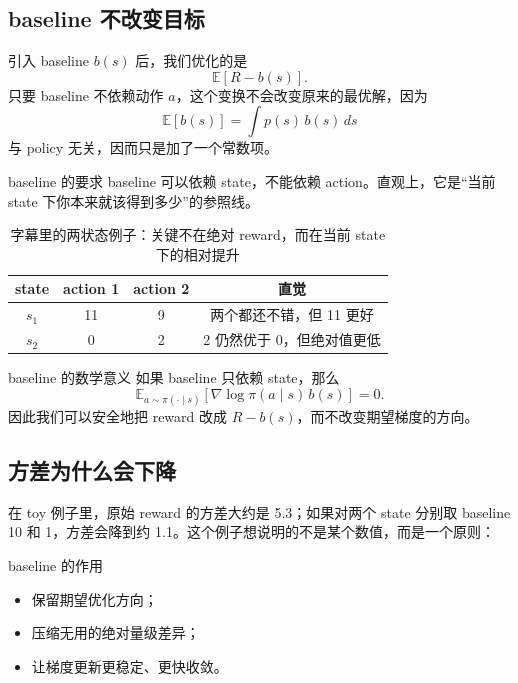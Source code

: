 \documentclass[a4paper]{article}
\begin{document}
\subsection{baseline 不改变目标}

引入 baseline $b(s)$ 后，我们优化的是
\[
\mathbb{E}[R - b(s)].
\]
只要 baseline 不依赖动作 $a$，这个变换不会改变原来的最优解，因为
\[
\mathbb{E}[b(s)] = \int p(s)\,b(s)\,ds
\]
与 policy 无关，因而只是加了一个常数项。

\begin{knowledgebox}{baseline 的要求}
baseline 可以依赖 state，不能依赖 action。直观上，它是“当前 state 下你本来就该得到多少”的参照线。
\end{knowledgebox}

\begin{table}[H]
\centering
\begin{tabular}{@{}cccc@{}}
\toprule
\textbf{state} & \textbf{action 1} & \textbf{action 2} & \textbf{直觉} \\
\midrule
$s_1$ & 11 & 9 & 两个都还不错，但 11 更好 \\
$s_2$ & 0 & 2 & 2 仍然优于 0，但绝对值更低 \\
\bottomrule
\end{tabular}
\caption{字幕里的两状态例子：关键不在绝对 reward，而在当前 state 下的相对提升}
\end{table}

\begin{knowledgebox}{baseline 的数学意义}
如果 baseline 只依赖 state，那么
\[
\mathbb{E}_{a \sim \pi(\cdot \mid s)}[\nabla \log \pi(a \mid s)\,b(s)] = 0.
\]
因此我们可以安全地把 reward 改成 $R-b(s)$，而不改变期望梯度的方向。
\end{knowledgebox}


\subsection{方差为什么会下降}

在 toy 例子里，原始 reward 的方差大约是 5.3；如果对两个 state 分别取 baseline 10 和 1，方差会降到约 1.1。这个例子想说明的不是某个数值，而是一个原则：

\begin{importantbox}{baseline 的作用}
\begin{itemize}
    \item 保留期望优化方向；
    \item 压缩无用的绝对量级差异；
    \item 让梯度更新更稳定、更快收敛。
\end{itemize}
\end{importantbox}
\end{document}
